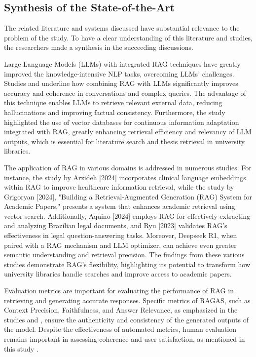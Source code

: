 \begin{refsection}
\section{Synthesis of the State-of-the-Art}

\hspace{1cm}The related literature and systems discussed have substantial relevance to the problem of the study. To have a clear understanding of this literature and studies, the researchers made a synthesis in the succeeding discussions.


\hspace{0.4cm}Large Language Models (LLMs) with integrated RAG techniques have greatly improved the knowledge-intensive NLP tasks, overcoming LLMs' challenges. Studies \cite{thapa2022splitfed} and \cite{thomo2024pubmed} underline how combining RAG with LLMs significantly improves accuracy and coherence in conversations and complex queries. The advantage of this technique enables LLMs to retrieve relevant external data, reducing hallucinations and improving factual consistency. Furthermore, the study \cite{lewis2020retrieval} highlighted the use of vector databases for continuous information adaptation integrated with RAG, greatly enhancing retrieval efficiency and relevancy of LLM outputs, which is essential for literature search and thesis retrieval in university libraries.


\hspace{0.4cm}The application of RAG in various domains is addressed in numerous studies. For instance, the study by Arzideh [2024] incorporates clinical language embeddings within RAG to improve healthcare information retrieval, while the study by Grigoryan [2024], "Building a Retrieval-Augmented Generation (RAG) System for Academic Papers," presents a system that enhances academic retrieval using vector search. Additionally, Aquino [2024] employs RAG for effectively extracting and analyzing Brazilian legal documents, and Ryu [2023] validates RAG’s effectiveness in legal question-answering tasks. Moreover, Deepseek R1, when paired with a RAG mechanism and LLM optimizer, can achieve even greater semantic understanding and retrieval precision. The findings from these various studies demonstrate RAG's flexibility, highlighting its potential to transform how university libraries handle searches and improve access to academic papers.

\hspace{0.4cm}Evaluation metrics are important for evaluating the performance of RAG in retrieving and generating accurate responses. Specific metrics of RAGAS, such as Context Precision, Faithfulness, and Answer Relevance, as emphasized in the studies \cite{sagi2024genai} and \cite{arzideh2024miracle}, ensure the authenticity and consistency of the generated outputs of the model. Despite the effectiveness of automated metrics, human evaluation remains important in assessing coherence and user satisfaction, as mentioned in this study \cite{aquino2024extracting}.


\end{refsection}
